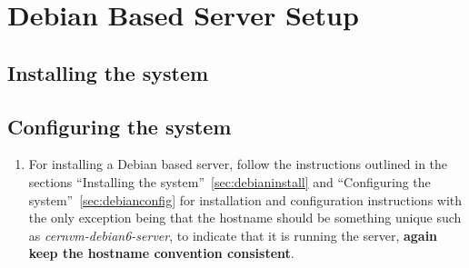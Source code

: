 \section{Debian Based Server Setup}
\subsection{Installing the system}
\subsection{Configuring the system}
\flushleft
\begin{enumerate}
\item 	For installing a Debian based server, follow the instructions outlined in the sections ``Installing the 
		system''~\ref{sec:debianinstall} and ``Configuring the system''~\ref{sec:debianconfig} for installation and configuration 
		instructions with the only exception being that the hostname should be something unique such as \emph{cernvm-debian6-server}, to 
		indicate that it is running the \tapper server, {\bf again keep the hostname convention consistent}.
\end{enumerate}


\newpage
